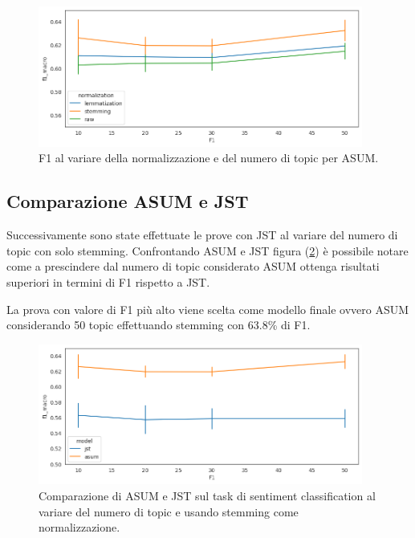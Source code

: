 \begin{figure}[ht]
  \centering
  \includegraphics[width=0.95\textwidth]{images/experiments/asum_normalization.png}
  \caption{F1 al variare della normalizzazione e del numero di topic per ASUM.}
  \label{fig:asum_normalization}
\end{figure}

\newpage
\subsection{Comparazione ASUM e JST}
Successivamente sono state effettuate le prove con JST al variare del numero di topic con solo stemming.
%
Confrontando ASUM e JST figura (\ref{fig:asum_vs_jst}) è possibile notare come a prescindere dal numero di topic considerato ASUM ottenga risultati superiori in termini di F1 rispetto a JST.

La prova con valore di F1 più alto viene scelta come modello finale ovvero ASUM considerando 50 topic effettuando stemming con 63.8\% di F1.

\begin{figure}[ht]
  \centering
  \includegraphics[width=0.95\textwidth]{images/experiments/asum_vs_jst.png}
  \caption{Comparazione di ASUM e JST sul task di sentiment classification al variare del numero di topic e usando stemming come normalizzazione.}
  \label{fig:asum_vs_jst}
\end{figure}

